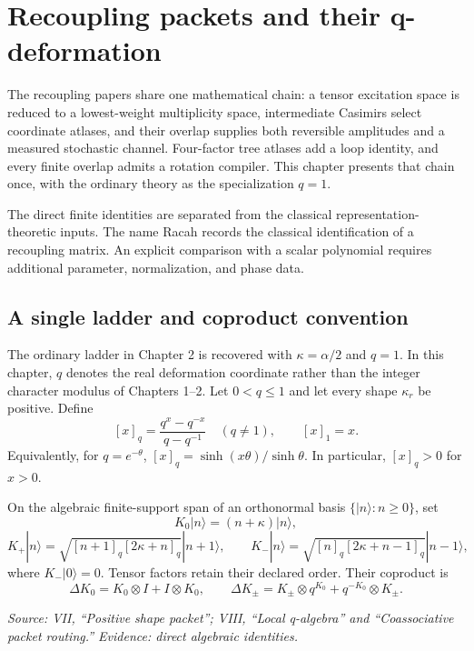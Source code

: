 \chapter{Recoupling packets and their q-deformation}

The recoupling papers share one mathematical chain: a tensor excitation space is reduced to a lowest-weight multiplicity space, intermediate Casimirs select coordinate atlases, and their overlap supplies both reversible amplitudes and a measured stochastic channel. Four-factor tree atlases add a loop identity, and every finite overlap admits a rotation compiler. This chapter presents that chain once, with the ordinary theory as the specialization $q=1$.

The direct finite identities are separated from the classical representation-theoretic inputs. The name Racah records the classical identification of a recoupling matrix. An explicit comparison with a scalar polynomial requires additional parameter, normalization, and phase data.

\section{A single ladder and coproduct convention}

The ordinary ladder in Chapter 2 is recovered with $\kappa=\alpha/2$ and $q=1$. In this chapter, $q$ denotes the real deformation coordinate rather than the integer character modulus of Chapters 1--2. Let $0<q\leq1$ and let every shape $\kappa_r$ be positive. Define
\[
[x]_q=\frac{q^x-q^{-x}}{q-q^{-1}}\quad(q\ne1),
\qquad [x]_1=x.
\]
Equivalently, for $q=e^{-\theta}$, $[x]_q=\sinh(x\theta)/\sinh\theta$. In particular, $[x]_q>0$ for $x>0$.

\begin{definition}
On the algebraic finite-support span of an orthonormal basis $\{|n\rangle:n\geq0\}$, set
\[
K_0|n\rangle=(n+\kappa)|n\rangle,
\]
\[
K_+|n\rangle=\sqrt{[n+1]_q[2\kappa+n]_q}|n+1\rangle,
\qquad
K_-|n\rangle=\sqrt{[n]_q[2\kappa+n-1]_q}|n-1\rangle,
\]
where $K_-|0\rangle=0$. Tensor factors retain their declared order. Their coproduct is
\[
\Delta K_0=K_0\otimes I+I\otimes K_0,
\qquad
\Delta K_\pm=K_\pm\otimes q^{K_0}+q^{-K_0}\otimes K_\pm.
\]
\end{definition}

\noindent\emph{Source: VII, ``Positive shape packet''; VIII, ``Local q-algebra'' and ``Coassociative packet routing.'' Evidence: direct algebraic identities.}

